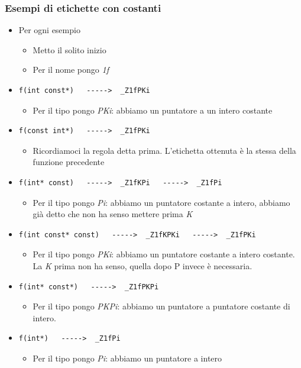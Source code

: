 \documentclass[11pt]{report}
\theoremstyle{definition}
\begin{document}
\subsubsection{Esempi di etichette con costanti}
\begin{itemize}
\item Per ogni esempio
\begin{itemize}
\item Metto il solito inizio
\item Per il nome pongo \emph{1f}
\end{itemize}
\item \begin{verbatim}
f(int const*)   ----->  _Z1fPKi
\end{verbatim}
\begin{itemize}
\item Per il tipo pongo \emph{PKi}: abbiamo un puntatore a un intero costante
\end{itemize}
\item \begin{verbatim}
f(const int*)   ----->  _Z1fPKi
\end{verbatim}
\begin{itemize}
\item Ricordiamoci la regola detta prima. L'etichetta ottenuta è la stessa della funzione precedente
\end{itemize}
\item \begin{verbatim}
f(int* const)   ----->  _Z1fKPi   ----->  _Z1fPi
\end{verbatim}
\begin{itemize}
\item Per il tipo pongo \emph{Pi}: abbiamo un puntatore costante a intero, abbiamo già detto che non ha senso mettere prima \emph{K}
\end{itemize}
\item \begin{verbatim}
f(int const* const)   ----->  _Z1fKPKi   ----->  _Z1fPKi
\end{verbatim}
\begin{itemize}
\item Per il tipo pongo \emph{PKi}: abbiamo un puntatore costante a intero costante. La \emph{K} prima non ha senso, quella dopo P invece è necessaria.
\end{itemize}
\item \begin{verbatim}
f(int* const*)   ----->  _Z1fPKPi
\end{verbatim}
\begin{itemize}
\item Per il tipo pongo \emph{PKPi}: abbiamo un puntatore a puntatore costante di intero.
\end{itemize}
\item \begin{verbatim}
f(int*)   ----->  _Z1fPi
\end{verbatim}
\begin{itemize}
\item Per il tipo pongo \emph{Pi}: abbiamo un puntatore a intero
\end{itemize}
\end{itemize}
\end{document}
